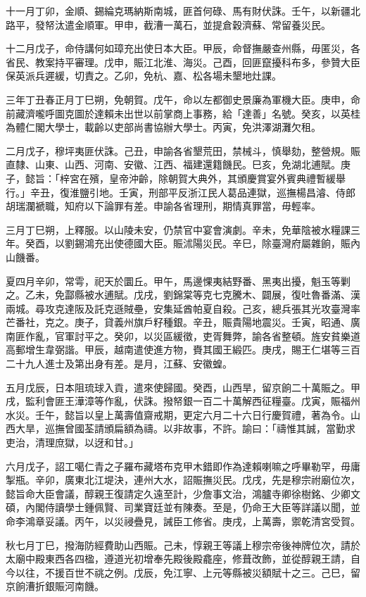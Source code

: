 \begin{pinyinscope}
十一月丁卯，金順、錫綸克瑪納斯南城，匪首何碌、馬有財伏誅。壬午，以新疆北路平，發帑汰遣金順軍。甲申，截漕一萬石，並提倉穀濟蘇、常留養災民。

十二月戊子，命侍講何如璋充出使日本大臣。甲辰，命督撫嚴查州縣，毋匿災，各省民、教案持平審理。戊申，賑江北淮、海災。己酉，回匪竄擾科布多，參贊大臣保英派兵遲緩，切責之。乙卯，免杭、嘉、松各場未墾地灶課。

三年丁丑春正月丁巳朔，免朝賀。戊午，命以左都御史景廉為軍機大臣。庚申，命前藏濟嚨呼圖克圖於達賴未出世以前掌商上事務，給「達善」名號。癸亥，以英桂為體仁閣大學士，載齡以吏部尚書協辦大學士。丙寅，免洪澤湖灘欠租。

二月戊子，穆坪夷匪伏誅。己丑，申諭各省墾荒田，禁械斗，慎舉劾，整營規。賑直隸、山東、山西、河南、安徽、江西、福建還籍饑民。巳亥，免湖北逋賦。庚子，懿旨：「梓宮在殯，皇帝沖齡，除朝賀大典外，其頒慶賞宴外賓典禮暫緩舉行。」辛丑，復淮鹽引地。壬寅，刑部平反浙江民人葛品連獄，巡撫楊昌濬、侍郎胡瑞瀾褫職，知府以下論罪有差。申諭各省理刑，期情真罪當，毋輕率。

三月丁巳朔，上釋服。以山陵未安，仍禁官中宴會演劇。辛未，免華陰被水糧課三年。癸酉，以劉錫鴻充出使德國大臣。賑沭陽災民。辛巳，除臺灣府屬雜餉，賑內山饑番。

夏四月辛卯，常雩，祀天於圜丘。甲午，馬邊惈夷結野番、黑夷出擾，魁玉等剿之。乙未，免酃縣被水逋賦。戊戌，劉錦棠等克七克騰木、闢展，復吐魯番滿、漢兩城。尋攻克達阪及託克遜賊壘，安集延酋帕夏自殺。己亥，總兵張其光攻臺灣率芒番社，克之。庚子，貸義州旗戶籽種銀。辛丑，賑貴陽地震災。壬寅，昭通、廣南匪作亂，官軍討平之。癸卯，以災區緩徵，吏胥舞弊，諭各省整頓。旌安貧樂道高郵增生韋弼諧。甲辰，越南遣使進方物，賚其國王緞匹。庚戌，賜王仁堪等三百二十九人進士及第出身有差。是月，江蘇、安徽蝗。

五月戊辰，日本阻琉球入貢，遣來使歸國。癸酉，山西旱，留京餉二十萬賑之。甲戌，監利會匪王澕漳等作亂，伏誅。撥帑銀一百二十萬解西征糧臺。戊寅，賑福州水災。壬午，懿旨以皇上萬壽值齋戒期，更定六月二十六日行慶賀禮，著為令。山西大旱，巡撫曾國荃請頒扁額為禱。以非故事，不許。諭曰：「禱惟其誠，當勤求吏治，清理庶獄，以迓和甘。」

六月戊子，詔工噶仁青之子羅布藏塔布克甲木錯即作為達賴喇嘛之呼畢勒罕，毋庸掣瓶。辛卯，廣東北江堤決，連州大水，詔賑撫災民。戊戌，先是穆宗祔廟位次，懿旨命大臣會議，醇親王復請定久遠至計，少詹事文治，鴻臚寺卿徐樹銘、少卿文碩，內閣侍讀學士鍾佩賢、司業寶廷並有陳奏。至是，仍命王大臣等詳議以聞，並命李鴻章妥議。丙午，以災祲疊見，誡臣工修省。庚戌，上萬壽，禦乾清宮受賀。

秋七月丁巳，撥海防經費助山西賑。己未，惇親王等議上穆宗帝後神牌位次，請於太廟中殿東西各四楹，遵道光初增奉先殿後殿龕座，修葺改飾，並從醇親王請，自今以往，不援百世不祧之例。戊辰，免江寧、上元等縣被災額賦十之三。己巳，留京餉漕折銀賑河南饑。


\end{pinyinscope}
